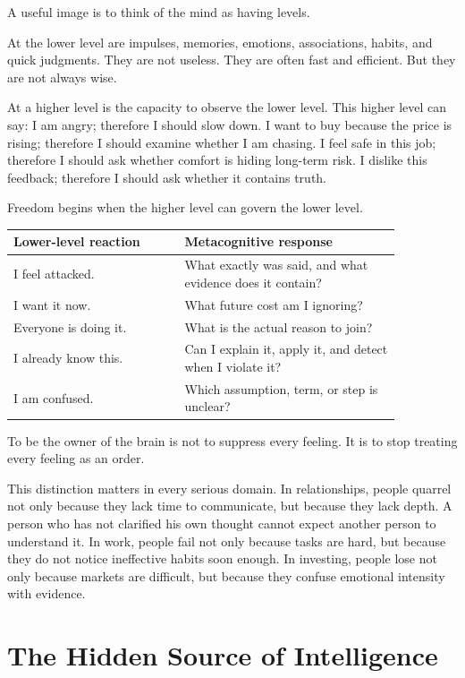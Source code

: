 A useful image is to think of the mind as having levels.

At the lower level are impulses, memories, emotions, associations, habits, and quick judgments. They are not useless. They are often fast and efficient. But they are not always wise.

At a higher level is the capacity to observe the lower level. This higher level can say: I am angry; therefore I should slow down. I want to buy because the price is rising; therefore I should examine whether I am chasing. I feel safe in this job; therefore I should ask whether comfort is hiding long-term risk. I dislike this feedback; therefore I should ask whether it contains truth.

Freedom begins when the higher level can govern the lower level.

\begin{center}
\begin{tabular}{p{0.38\linewidth}p{0.48\linewidth}}
\hline
Lower-level reaction & Metacognitive response \\
\hline
I feel attacked. & What exactly was said, and what evidence does it contain? \\
I want it now. & What future cost am I ignoring? \\
Everyone is doing it. & What is the actual reason to join? \\
I already know this. & Can I explain it, apply it, and detect when I violate it? \\
I am confused. & Which assumption, term, or step is unclear? \\
\hline
\end{tabular}
\end{center}

To be the owner of the brain is not to suppress every feeling. It is to stop treating every feeling as an order.

This distinction matters in every serious domain. In relationships, people quarrel not only because they lack time to communicate, but because they lack depth. A person who has not clarified his own thought cannot expect another person to understand it. In work, people fail not only because tasks are hard, but because they do not notice ineffective habits soon enough. In investing, people lose not only because markets are difficult, but because they confuse emotional intensity with evidence.

\section*{The Hidden Source of Intelligence}

